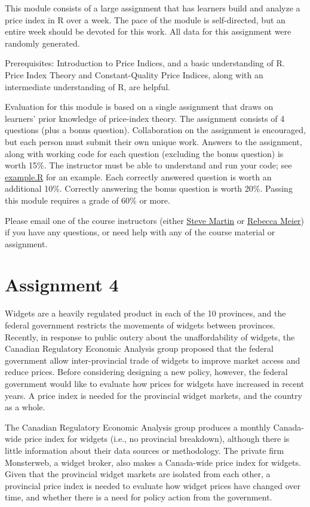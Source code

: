 \documentclass[]{article}
\begin{document}
This module consists of a large assignment that has learners build and analyze a price index in R over a week. The pace of the module is self-directed, but an entire week should be devoted for this work. All data for this assignment were randomly generated.

Prerequisites: Introduction to Price Indices, and a basic understanding of R. Price Index Theory and Constant-Quality Price Indices, along with an intermediate understanding of R, are helpful.

Evaluation for this module is based on a single assignment that draws on learners' prior knowledge of price-index theory. The assignment consists of 4 questions (plus a bonus question). Collaboration on the assignment is encouraged, but each person must submit their own unique work. Answers to the assignment, along with working code for each question (excluding the bonus question) is worth 15\%. The instructor must be able to understand and run your code; see \href{scripts/example.R}{example.R} for an example. Each correctly answered question is worth an additional 10\%. Correctly answering the bonus question is worth 20\%. Passing this module requires a grade of 60\% or more.

Please email one of the course instructors (either \href{mailto:steve.martin5@canada.ca}{Steve Martin} or \href{mailto:rebecca.meier@canada.ca}{Rebecca Meier}) if you have any questions, or need help with any of the course material or assignment.

\hypertarget{assignment-4}{%
\section{Assignment 4}\label{assignment-4}}

Widgets are a heavily regulated product in each of the 10 provinces, and the federal government restricts the movements of widgets between provinces. Recently, in response to public outcry about the unaffordability of widgets, the Canadian Regulatory Economic Analysis group proposed that the federal government allow inter-provincial trade of widgets to improve market access and reduce prices. Before considering designing a new policy, however, the federal government would like to evaluate how prices for widgets have increased in recent years. A price index is needed for the provincial widget markets, and the country as a whole.

The Canadian Regulatory Economic Analysis group produces a monthly Canada-wide price index for widgets (i.e., no provincial breakdown), although there is little information about their data sources or methodology. The private firm Monsterweb, a widget broker, also makes a Canada-wide price index for widgets. Given that the provincial widget markets are isolated from each other, a provincial price index is needed to evaluate how widget prices have changed over time, and whether there is a need for policy action from the government.
\end{document}
